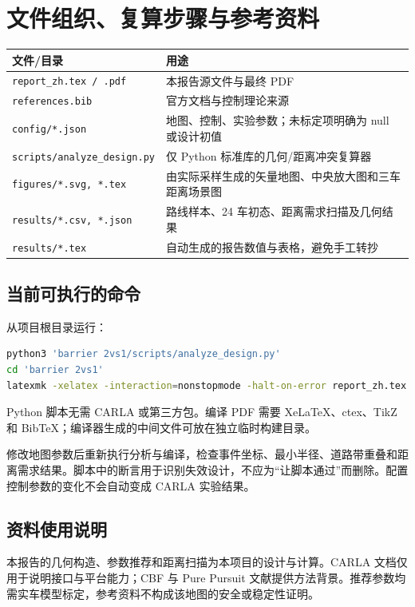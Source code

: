\documentclass[UTF8,fontset=fandol,11pt,a4paper]{ctexart}
\newcommand{\page}[1]{\clearpage\section{#1}}
\begin{document}
\page{文件组织、复算步骤与参考资料}
\begin{center}\small
\begin{tabular}{P{5.1cm}P{8.1cm}}\toprule
文件/目录 & 用途\\\midrule
\texttt{report\_zh.tex / .pdf} & 本报告源文件与最终 PDF\\
\texttt{references.bib} & 官方文档与控制理论来源\\
\texttt{config/*.json} & 地图、控制、实验参数；未标定项明确为 null 或设计初值\\
\texttt{scripts/analyze\_design.py} & 仅 Python 标准库的几何/距离冲突复算器\\
\texttt{figures/*.svg, *.tex} & 由实际采样生成的矢量地图、中央放大图和三车距离场景图\\
\texttt{results/*.csv, *.json} & 路线样本、24 车初态、距离需求扫描及几何结果\\
\texttt{results/*.tex} & 自动生成的报告数值与表格，避免手工转抄\\\bottomrule
\end{tabular}\end{center}
\subsection{当前可执行的命令}
从项目根目录运行：
\begin{lstlisting}[language=bash]
python3 'barrier 2vs1/scripts/analyze_design.py'
cd 'barrier 2vs1'
latexmk -xelatex -interaction=nonstopmode -halt-on-error report_zh.tex
\end{lstlisting}
Python 脚本无需 CARLA 或第三方包。编译 PDF 需要 XeLaTeX、ctex、TikZ 和 BibTeX；编译器生成的中间文件可放在独立临时构建目录。

修改地图参数后重新执行分析与编译，检查事件坐标、最小半径、道路带重叠和距离需求结果。脚本中的断言用于识别失效设计，不应为“让脚本通过”而删除。配置控制参数的变化不会自动变成 CARLA 实验结果。

\subsection{资料使用说明}
本报告的几何构造、参数推荐和距离扫描为本项目的设计与计算。CARLA 文档仅用于说明接口与平台能力；CBF 与 Pure Pursuit 文献提供方法背景。推荐参数均需实车模型标定，参考资料不构成该地图的安全或稳定性证明。

\clearpage
\small


\end{document}

